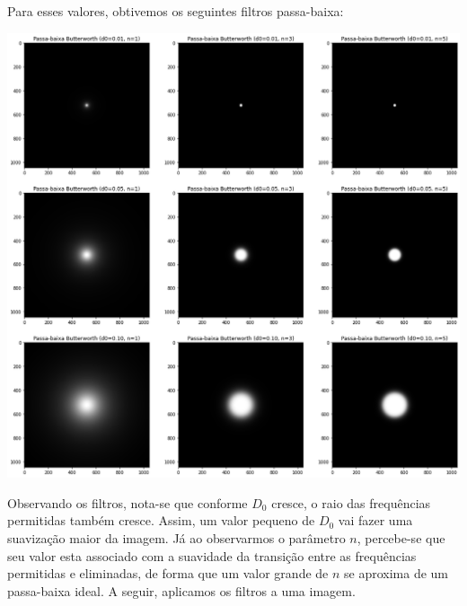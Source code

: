 \documentclass[12pt,a4paper]{article}
\begin{document}
Para esses valores, obtivemos os seguintes filtros passa-baixa:

\vspace{1em}
\begin{center}
	\includegraphics[width=\textwidth]{filtros_low_pass}
\end{center}
\vspace{1em}

Observando os filtros, nota-se que conforme $D_0$ cresce, o raio das frequências permitidas também cresce. Assim, um valor pequeno de $D_0$ vai fazer uma suavização maior da imagem. Já ao observarmos o parâmetro $n$, percebe-se que seu valor esta associado com a suavidade da transição entre as frequências permitidas e eliminadas, de forma que um valor grande de $n$ se aproxima de um passa-baixa ideal. A seguir, aplicamos os filtros a uma imagem.
\end{document}
